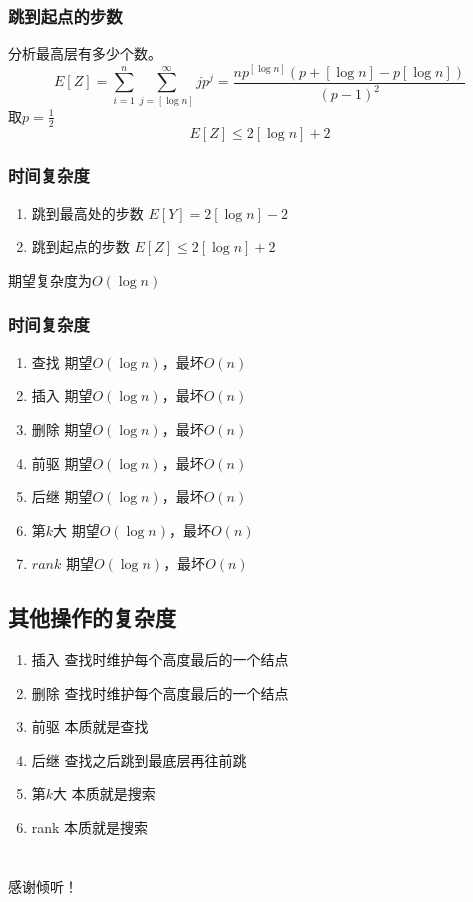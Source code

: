 \documentclass{beamer}
\begin{document}
	\begin{frame}
		\frametitle{跳到起点的步数}
		分析最高层有多少个数。
		$$E[Z] = \sum_{i=1}^{n}\sum_{j=[\log n]}^{\infty}jp^{j} 
		= \frac{np^{[\log{n}]} (p+[\log{n}]-p[\log{n}])}{(p-1)^2} $$
		\pause
		取$p=\frac{1}{2}$\\
		$$E[Z] \leq 2[\log{n}]+2$$
	\end{frame}
	\begin{frame}
		\frametitle{时间复杂度}
		\begin{enumerate}
			\item 跳到最高处的步数 \quad $E[Y] = 2[\log{n}]-2$
			\item 跳到起点的步数 \quad $E[Z] \leq 2[\log{n}]+2$
		\end{enumerate}
		期望复杂度为$O(\log{n})$ \\
	\end{frame}

	\begin{frame}
		\frametitle{时间复杂度}
		\begin{enumerate}
			\item 查找 \quad 期望$O(\log n)$，最坏$O(n)$
			\item 插入 \quad 期望$O(\log n)$，最坏$O(n)$
			\item 删除 \quad 期望$O(\log n)$，最坏$O(n)$
			\item 前驱 \quad 期望$O(\log n)$，最坏$O(n)$
			\item 后继 \quad 期望$O(\log n)$，最坏$O(n)$
			\item 第$k$大 \quad 期望$O(\log n)$，最坏$O(n)$
			\item $rank$ \quad 期望$O(\log n)$，最坏$O(n)$
		\end{enumerate}
	\end{frame}
	\subsection{其他操作的复杂度}
	\begin{frame}
		\begin{enumerate}
			\item 插入 \quad 查找时维护每个高度最后的一个结点
			\item 删除 \quad 查找时维护每个高度最后的一个结点
			\item 前驱 \quad 本质就是查找
			\item 后继 \quad 查找之后跳到最底层再往前跳
			\item 第$k$大 \quad 本质就是搜索
			\item rank \quad 本质就是搜索
		\end{enumerate}
	\end{frame}
	\section*{}
	\begin{frame}
		感谢倾听！
	\end{frame}
\end{document}
